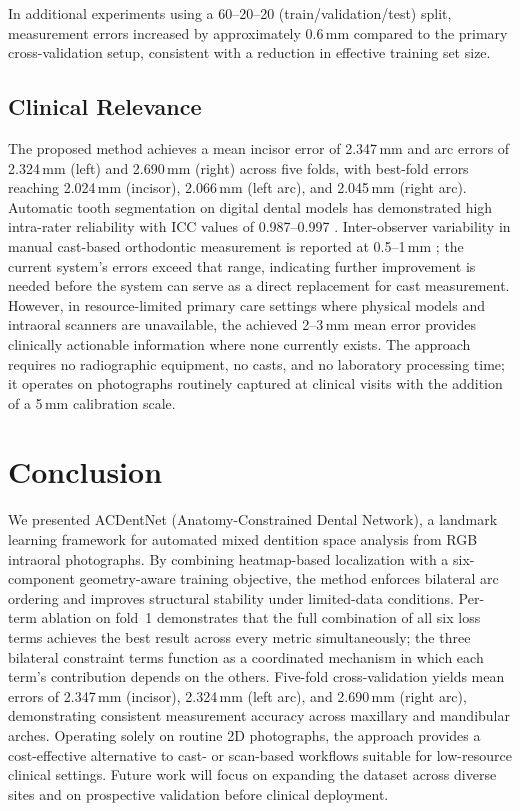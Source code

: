 \documentclass[conference]{IEEEtran}
\begin{document}
In additional experiments using a 60--20--20 (train/validation/test) split, measurement
errors increased by approximately 0.6\,mm compared to the primary cross-validation setup,
consistent with a reduction in effective training set size.

\subsection{Clinical Relevance}

The proposed method achieves a mean incisor error of 2.347\,mm and arc errors of 2.324\,mm
(left) and 2.690\,mm (right) across five folds, with best-fold errors reaching 2.024\,mm
(incisor), 2.066\,mm (left arc), and 2.045\,mm (right arc). Automatic tooth segmentation on
digital dental models has demonstrated high intra-rater reliability with ICC values of
0.987--0.997 \cite{im2022toothsegmentation}. Inter-observer variability in manual cast-based
orthodontic measurement is reported at 0.5--1\,mm \cite{schwendicke2020artificial}; the
current system's errors exceed that range, indicating further improvement is needed before the
system can serve as a direct replacement for cast measurement. However, in resource-limited
primary care settings where physical models and intraoral scanners are unavailable, the
achieved 2--3\,mm mean error provides clinically actionable information where none currently
exists. The approach requires no radiographic equipment, no casts, and no laboratory processing
time; it operates on photographs routinely captured at clinical visits with the addition of a
5\,mm calibration scale.

\section{Conclusion}

We presented ACDentNet (Anatomy-Constrained Dental Network), a landmark learning framework for
automated mixed dentition space analysis from RGB intraoral photographs. By combining
heatmap-based localization with a six-component geometry-aware training objective, the method
enforces bilateral arc ordering and improves structural stability under limited-data conditions.
Per-term ablation on fold~1 demonstrates that the full combination of all six loss terms
achieves the best result across every metric simultaneously; the three bilateral constraint
terms function as a coordinated mechanism in which each term's contribution depends on the
others. Five-fold cross-validation yields mean errors of 2.347\,mm (incisor), 2.324\,mm (left
arc), and 2.690\,mm (right arc), demonstrating consistent measurement accuracy across
maxillary and mandibular arches. Operating solely on routine 2D photographs, the approach
provides a cost-effective alternative to cast- or scan-based workflows suitable for
low-resource clinical settings. Future work will focus on expanding the dataset across diverse
sites and on prospective validation before clinical deployment.
\end{document}
